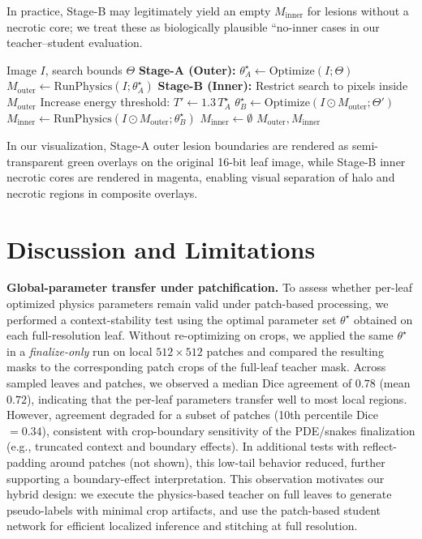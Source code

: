 \documentclass[11pt,a4paper]{article}
\begin{document}
In practice, Stage-B may legitimately yield an empty $M_{\text{inner}}$ for lesions without a necrotic core; we treat these as biologically plausible ``no-inner cases in our teacher--student evaluation.

\begin{algorithm}
\caption{Two-Stage Nested Lesion Inference}
\label{alg:two_stage}
\begin{algorithmic}[1]
\REQUIRE Image $I$, search bounds $\Theta$
\STATE \textbf{Stage-A (Outer):} $\theta_A^\star \leftarrow \mathrm{Optimize}(I;\Theta)$
\STATE $M_{\text{outer}} \leftarrow \mathrm{RunPhysics}(I;\theta_A^\star)$ 
    \STATE \textbf{Stage-B (Inner):} Restrict search to pixels inside $M_{\text{outer}}$
    \STATE Increase energy threshold: $T' \leftarrow 1.3\,T_A^\star$
    \STATE $\theta_B^\star \leftarrow \mathrm{Optimize}(I \odot M_{\text{outer}};\Theta')$
    \STATE $M_{\text{inner}} \leftarrow \mathrm{RunPhysics}(I \odot M_{\text{outer}};\theta_B^\star)$ 
\ELSE
    \STATE $M_{\text{inner}} \leftarrow \emptyset$
\ENDIF
\RETURN $M_{\text{outer}}, M_{\text{inner}}$
\end{algorithmic}
\end{algorithm}

In our visualization, Stage-A outer lesion boundaries are rendered as semi-transparent green overlays on the original 16-bit leaf image, while Stage-B inner necrotic cores are rendered in magenta, enabling visual separation of halo and necrotic regions in composite overlays.

\section{Discussion and Limitations}

\textbf{Global-parameter transfer under patchification.}
To assess whether per-leaf optimized physics parameters remain valid under patch-based processing, we performed a context-stability test using the optimal parameter set $\theta^\star$ obtained on each full-resolution leaf. Without re-optimizing on crops, we applied the same $\theta^\star$ in a \emph{finalize-only} run on local $512\times512$ patches and compared the resulting masks to the corresponding patch crops of the full-leaf teacher mask. Across sampled leaves and patches, we observed a median Dice agreement of $0.78$ (mean $0.72$), indicating that the per-leaf parameters transfer well to most local regions. However, agreement degraded for a subset of patches (10th percentile Dice $=0.34$), consistent with crop-boundary sensitivity of the PDE/snakes finalization (e.g., truncated context and boundary effects). In additional tests with reflect-padding around patches (not shown), this low-tail behavior reduced, further supporting a boundary-effect interpretation. This observation motivates our hybrid design: we execute the physics-based teacher on full leaves to generate pseudo-labels with minimal crop artifacts, and use the patch-based student network for efficient localized inference and stitching at full resolution.
\end{document}
